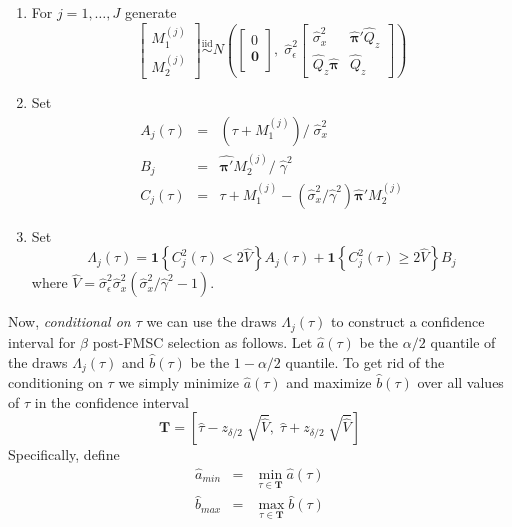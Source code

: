 \documentclass[12pt]{article}
\theoremstyle{definition}
\begin{document}
\begin{enumerate}
  \item For $j = 1, \hdots, J$ generate
    $$\left[ \begin{array}
      {c} M_1^{(j)} \\ M_2^{(j)}
    \end{array}\right] \overset{\mbox{iid}}{\sim} N\left( \left[ \begin{array}
      {c} 0 \\ \textbf{0}\\
    \end{array}\right], \;\widehat{\sigma}_\epsilon^2\left[ \begin{array}
      {cc}
      \widehat{\sigma}_x^2& \widehat{\boldsymbol{\pi}}' \widehat{Q}_z\\
      \widehat{Q}_z\widehat{\boldsymbol{\pi}} & \widehat{Q}_z
    \end{array}\right] \right) $$
  \item Set
    \begin{eqnarray*}
        A_j(\tau) &=&  \left(\tau + M_1^{(j)} \right)/\; \widehat{\sigma}_x^2\\    
        B_j &=& \widehat{\boldsymbol{\pi}'}M_2^{(j)}/\; \widehat{\gamma}^2\\
        C_j(\tau)&=& \tau + M_1^{(j)} - (\widehat{\sigma}_x^2/\widehat{\gamma}^2) \widehat{\boldsymbol{\pi}}' M_2^{(j)}
    \end{eqnarray*}
  \item Set 
    $$\Lambda_j(\tau) = \mathbf{1}\left\{ C_j^2(\tau)< 2 \widehat{V} \right\} A_j(\tau) +  \mathbf{1}\left\{ C_j^2(\tau)\geq 2 \widehat{V} \right\} B_j$$
    where $\widehat{V} = \widehat{\sigma}^2_\epsilon \widehat{\sigma}^2_x \left(\widehat{\sigma}_x^2/\widehat{\gamma}^2 - 1 \right)$.
\end{enumerate}
Now, \emph{conditional on $\tau$} we can use the draws $\Lambda_j(\tau)$ to construct a confidence interval for $\beta$ post-FMSC selection as follows. Let $\widehat{a}(\tau)$ be the $\alpha/2$ quantile of the draws $\Lambda_j(\tau)$ and $\widehat{b}(\tau)$ be the $1- \alpha/2$ quantile. To get rid of the conditioning on $\tau$ we simply minimize $\widehat{a}(\tau)$ and maximize $\widehat{b}(\tau)$ over all values of $\tau$ in the confidence interval 
  $$\mathbf{T} = \left[ \widehat{\tau} - z_{\delta/2} \; \sqrt{\widehat{V}},  \; \widehat{\tau} + z_{\delta/2} \; \sqrt{\widehat{V}} \right]$$
Specifically, define
    \begin{eqnarray*}
      \widehat{a}_{min} &=& \min_{\tau \in \mathbf{T}} \widehat{a}(\tau)\\
      \widehat{b}_{max} &=& \max_{\tau \in \mathbf{T}} \widehat{b}(\tau)
    \end{eqnarray*}
\end{document}
